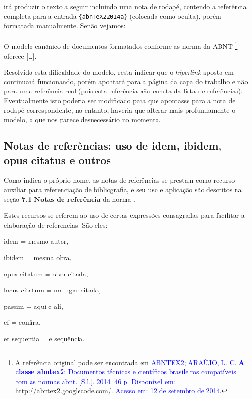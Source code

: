\begin{apendicesenv}
irá produzir o texto a seguir incluindo uma nota de rodapé, contendo a referência completa para a entrada \verb|{abnTeX22014a}| (colocada como oculta), porém formatada manualmente. Senão vejamos:
\\
\\
O modelo canônico de documentos formatados conforme as norma da ABNT  \footnote{A referência original pode ser encontrada em \textcolor{blue}{ABNTEX2; ARA\'UJO, L. C. \textbf{A classe abntex2}: Documentos técnicos e científicos brasileiros	compatíveis com as normas abnt. [S.l.], 2014. 46 p. Disponível em: \href{https://code.google.com/p/abntex2/wiki/Download?tm=2}{http://abntex2.googlecode.com/}. Acesso em: 12 de setembro de 2014.}} oferece [\ldots].


Resolvido esta dificuldade do modelo, resta indicar que o \textit{hiperlink} aposto em  continuará funcionando, porém apontará para a página da capa do trabalho e não para uma referência real (pois esta referência não consta da lista de referências). Eventualmente isto poderia ser modificado para que apontasse para a nota de rodapé correspondente, no entanto, haveria que alterar mais profundamente o modelo, o que nos parece desnecessário no momento.



\subsection{Notas de referências: uso de idem, ibidem, opus citatus e outros}
\label{subsec:notasRefs}

Como indica o próprio nome, as notas de referências se prestam como recurso auxiliar para referenciação de bibliografia, e seu uso e aplicação são descritos na seção \textbf{7.1 Notas de referência} da norma . 

Estes recursos se referem ao uso de certas expressões consagradas para facilitar a elaboração de referencias. São eles:

\begin{compactitem}
	\item idem = mesmo autor,
	\item ibidem = mesma obra,
	\item opus citatum = obra citada,
	\item locus citatum = no lugar citado,
	\item passim = aqui e alí,
	\item cf = confira,
	\item et sequentia = e sequência.
\end{compactitem}



\end{apendicesenv}
